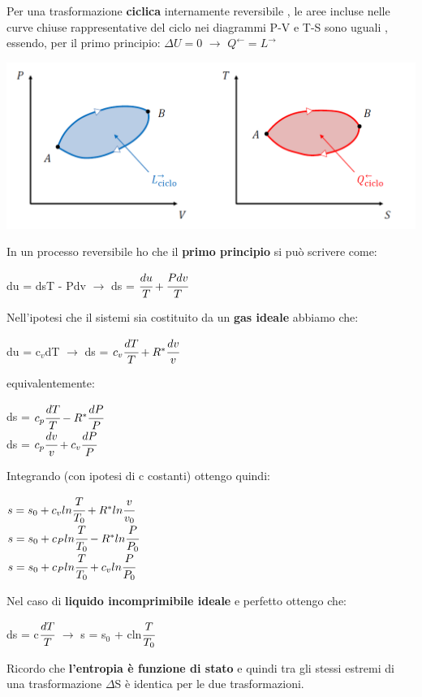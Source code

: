 \documentclass[a4paper,12pt,titlepage]{article}
\begin{document}
Per una trasformazione \textbf{ciclica} internamente reversibile , le aree incluse
nelle curve chiuse rappresentative del ciclo nei diagrammi P-V e T-S sono uguali , essendo, per il primo principio:
$ \varDelta U = 0$  $\rightarrow$  $Q^{\leftarrow} = L^{\rightarrow}$
\begin{center}
\includegraphics[scale=0.4]{cycle_same_q_l}
\end{center}
In un processo reversibile ho che il \textbf{primo principio} si può scrivere come:
\begin{center}
du = dsT - Pdv $\rightarrow$ ds = $\cfrac{du}{T} + \cfrac{Pdv}{T}$
\end{center}
Nell'ipotesi che il sistemi sia costituito da un \textbf{gas ideale} abbiamo che:
\begin{center}
du = c$_{v}$dT $\rightarrow$ ds = $c_{v}\cfrac{dT}{T} + R^{*}\cfrac{dv}{v}$
\end{center}
equivalentemente:
\begin{center}
ds = $c_{p}\cfrac{dT}{T} - R^{*}\cfrac{dP}{P}$\\
ds = $c_{p}\cfrac{dv}{v} + c_{v}\cfrac{dP}{P}$
\end{center}
Integrando (con ipotesi di c costanti) ottengo quindi:
\begin{center}
$ s = s_{0} + c_{v}ln\cfrac{T}{T_{0}} + R^{*}ln\cfrac{v}{v_{0}}$ \\
$ s = s_{0} + c_{P}ln\cfrac{T}{T_{0}} - R^{*}ln\cfrac{P}{P_{0}}$ \\
$ s = s_{0} + c_{P}ln\cfrac{T}{T_{0}} + c_{v}ln\cfrac{P}{P_{0}}$
\end{center}
Nel caso di \textbf{liquido incomprimibile ideale} e perfetto ottengo che:
\begin{center}
ds = c$\cfrac{dT}{T} $ $\rightarrow$ s = s$_{0}$ + cln$\cfrac{T}{T_{0}}$
\end{center}
Ricordo che \textbf{l'entropia è funzione di stato} e quindi tra gli stessi estremi di una trasformazione $\varDelta$S è identica per le due trasformazioni. 
\clearpage
\end{document}
